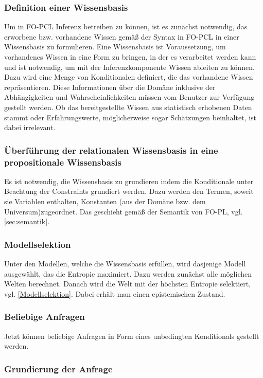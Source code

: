 \documentclass[a4paper, 11pt]{book}
\begin{document}
\subsubsection{Definition einer Wissensbasis}	
Um in FO-PCL Inferenz betreiben zu können, ist es zunächst notwendig, das erworbene bzw. vorhandene Wissen gemäß der Syntax in FO-PCL in einer Wissensbasis zu formulieren. Eine Wissensbasis ist Voraussetzung, um vorhandenes Wissen in eine Form zu bringen, in der es verarbeitet werden kann und ist notwendig, um mit der Inferenzkomponente Wissen ableiten zu können. Dazu wird eine Menge von Konditionalen definiert, die das vorhandene Wissen repräsentieren.  Diese Informationen über die Domäne inklusive der Abhängigkeiten und Wahrscheinlichkeiten müssen vom Benutzer zur Verfügung gestellt werden. Ob das bereitgestellte Wissen aus statistisch erhobenen Daten stammt oder Erfahrungswerte, möglicherweise sogar Schätzungen beinhaltet, ist dabei irrelevant.

\subsubsection{Überführung der relationalen Wissensbasis in eine propositionale Wissensbasis}
Es ist notwendig, die Wissensbasis zu grundieren indem die Konditionale unter Beachtung der Constraints grundiert werden. Dazu werden den Termen, soweit sie Variablen enthalten, Konstanten (aus der Domäne bzw. dem Universum)zugeordnet. Das geschieht gemäß der Semantik von FO-PL, vgl. \ref{sec:semantik}.
	
\subsubsection{Modellselektion}
Unter den Modellen, welche die Wissensbasis erfüllen, wird dasjenige Modell ausgewählt, das die Entropie maximiert. Dazu werden zunächst alle möglichen Welten berechnet. Danach wird die Welt mit der höchsten Entropie selektiert, vgl. \ref{Modellselektion}. Dabei erhält man einen epistemischen Zustand.
	
\subsubsection{Beliebige Anfragen}
Jetzt können beliebige Anfragen in Form eines unbedingten Konditionals gestellt werden.   

\subsubsection{Grundierung der Anfrage}
\end{document}
